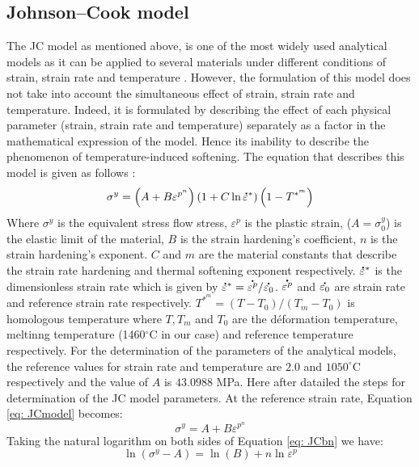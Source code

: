 \documentclass[twoside,english,1p,final,sort&compress]{elsarticle}
\theoremstyle{plain}
\newcommand{\mdot}[1]{\accentset{\mbox{\bfseries .}}{#1}}
\begin{document}
\subsection{Johnson--Cook model\label{sec:JC}}
The JC model as mentioned above, is one of the most widely used analytical models as it can be applied to several materials under different conditions of strain, strain rate and temperature . However, the formulation of this model does not take into account the simultaneous effect of strain, strain rate and temperature. Indeed, it is formulated by describing the effect of each physical parameter (strain, strain rate and temperature) separately as a factor in the mathematical expression of the model. Hence its inability to describe the phenomenon of temperature-induced softening. The equation that describes this model is given as follows \cite{Johnson-1985}:
\begin{equation}
\label{eq: JCmodel}
\sigma^y = \left(A + B\varepsilon^{p^n}\right)\left(1+C\ln\mdot{\varepsilon}^*\right)\left(1-T^{*^m}\right)
\end{equation}
Where $\sigma^y$ is the equivalent stress flow stress, $\varepsilon^p$ is the plastic strain, ($A=\sigma^y_0$) is the elastic limit of the material, $B$ is the strain hardening's coefficient, $n$ is the strain hardening's exponent. $C$ and $m$ are the material constants that describe the strain rate hardening and thermal softening exponent respectively. $\mdot{\varepsilon}^*$ is the dimensionless strain rate which is given by $\mdot{\varepsilon}^* = \mdot{\varepsilon^p}/\mdot{\varepsilon_0}$. $\mdot{\varepsilon^p}$ and $\mdot{\varepsilon_0}$ are strain rate and reference strain rate respectively. $T^{*^m} = (T-T_0)/(T_m - T_0)$ is homologous temperature where $T, T_m$ and $T_0$ are the déformation temperature, meltinng temperature (1460$^\circ$C in our case) and reference temperature respectively. For the determination of the parameters of the analytical models, the reference values for strain rate and temperature are $2.0$ and $1050^\circ$C respectively and the value of $A$ is $43.0988$ MPa. Here after datailed the steps for determination of the JC model parameters.
At the reference strain rate, Equation \ref{eq: JCmodel} becomes:
\begin{equation}
\label{eq: JCbn}
\sigma^y = A + B\varepsilon^{p^n}
\end{equation}
Taking the natural logarithm on both sides of Equation \ref{eq: JCbn} we have:
\begin{equation}
\label{eq:JClog1}
\ln\left(\sigma^y-A\right)= \ln(B) + n\ln\varepsilon^p
\end{equation}
\end{document}
